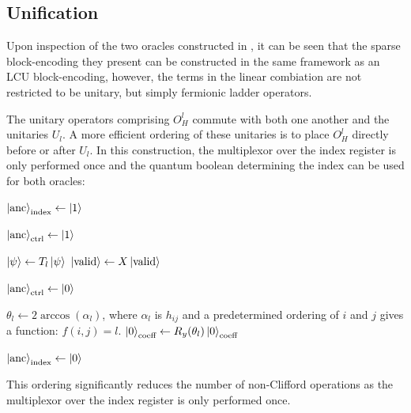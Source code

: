 \subsection{Unification}
\label{subsec:unification}

Upon inspection of the two oracles constructed in \cite{liu2024efficient}, it can be seen that the sparse block-encoding they present can be constructed in the same framework as an LCU block-encoding, however, the terms in the linear combiation are not restricted to be unitary, but simply fermionic ladder operators.

The unitary operators comprising $O_H^l$ commute with both one another and the unitaries $U_l$. 
A more efficient ordering of these unitaries is to place $O_H^l$ directly before or after $U_l$.
In this construction, the multiplexor over the index register is only performed once and the quantum boolean determining the index can be used for both oracles:
\begin{algorithmic}[1]
            \State $\ket{\text{anc}}_{\text{index}} \gets \ket{1}$
        \EndIf

            \State $\ket{\text{anc}}_{\text{ctrl}} \gets \ket{1}$
        \EndIf

            \State $\ket{\psi} \gets T_l \ket{\psi}$
            \State $\ket{\text{valid}} \gets X \ket{\text{valid}}$
        \EndIf

        \State $\ket{\text{anc}}_{\text{ctrl}} \gets \ket{0}$

            \State $\theta_l \gets 2\arccos(\alpha_l)$, where $\alpha_l$ is $h_{ij}$ and a predetermined ordering of $i$ and $j$ gives a function: $f(i, j) = l$.
            \State $\ket{0}_{\text{coeff}} \gets R_y(\theta_l) \ket{0}_{\text{coeff}}$ 
        \EndIf

        \State $\ket{\text{anc}}_{\text{index}} \gets \ket{0}$
    \EndFor
\end{algorithmic}
This ordering significantly reduces the number of non-Clifford operations as the multiplexor over the index register is only performed once.

